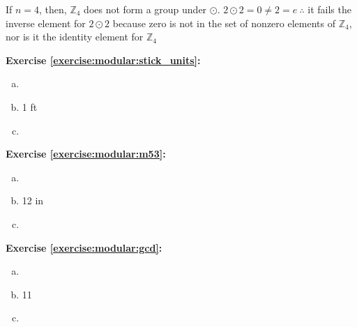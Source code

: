 \begin{enumerate}[(a)]
If $n = 4$, then, $\mathbb Z_{4}$ does not form a group under $\odot$. $2\odot 2 = 0\neq2 = e\  \therefore$ it fails the inverse element for $2\odot 2$ because zero is not in the set of nonzero elements of $\mathbb Z_{4}$, nor is it the identity element for $\mathbb Z_{4}$
\end{enumerate}


\noindent\textbf{Exercise \ref{exercise:modular:stick_units}:} 
\begin{enumerate}[(a)]
\item

\item
1 ft

\item
\end{enumerate}

\noindent\textbf{Exercise \ref{exercise:modular:m53}:}
\begin{enumerate}[(a)]
\item

\item
12 in

\item
\end{enumerate}

\noindent\textbf{Exercise \ref{exercise:modular:gcd}:}
\begin{enumerate}[(a)]
\item

\item
11
\item

\end{enumerate}


